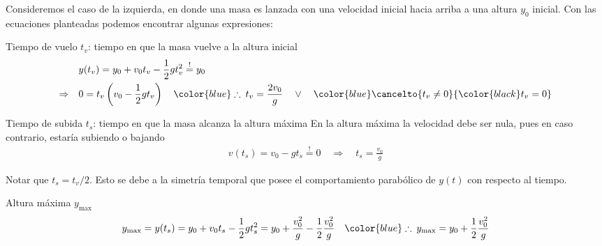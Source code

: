 \documentclass[letterpaper,11pt]{article}
\begin{document}
\noindent Consideremos el caso de la izquierda, en donde una masa es lanzada con una velocidad inicial hacia arriba a una altura $y_0$ inicial. Con las ecuaciones planteadas podemos encontrar algunas expresiones:

\begin{itemize}
    \begin{minipage}{0.7\linewidth}
        \item Tiempo de vuelo $t_v$: tiempo en que la masa vuelve a la altura inicial
        \begin{align*}
            & y(t_v) = y_0 + v_0 t_v -\frac{1}{2} g t_v^2 \stackrel{!}{=} y_0 \\
            \Rightarrow \quad & 0 = t_v\left(v_0 - \frac{1}{2} g t_v\right) \quad {\color{blue}\therefore} \hspace{0.5em} t_v = \frac{2v_0}{g} \hspace{1em} \vee \hspace{1em} {\color{blue}\cancelto{t_v\neq 0}{\color{black} t_v = 0}}
        \end{align*}
    \end{minipage}
    \hspace{1em}
    \begin{minipage}{0.25\linewidth}
        \begin{figure}[H]
            \centering
            
        \end{figure}
    \end{minipage}
    
    \item Tiempo de subida $t_s$: tiempo en que la masa alcanza la altura máxima\newline
    En la altura máxima la velocidad debe ser nula, pues en caso contrario, estaría subiendo o bajando
    \begin{align*}
        v(t_s)=v_0 - gt_s \stackrel{!}{=} 0 \quad \Rightarrow \quad t_s = \frac{v_0}{g}
    \end{align*}
    
    Notar que $t_s = t_v/2$. Esto se debe a la simetría temporal que posee el comportamiento parabólico de $y(t)$ con respecto al tiempo.
    
    \item Altura máxima $y_{\text{max}}$
    \begin{align*}
        y_{\text{max}} = y(t_s) = y_0 + v_0 t_s - \frac{1}{2} g t_s^2 = y_0 + \frac{v_0^2}{g} - \frac{1}{2}\frac{v_0^2}{g} \quad {\color{blue} \therefore} \hspace{0.5em} y_{\text{max}} = y_0 + \frac{1}{2}\frac{v_0^2}{g}
    \end{align*}
\end{itemize}
\end{document}
